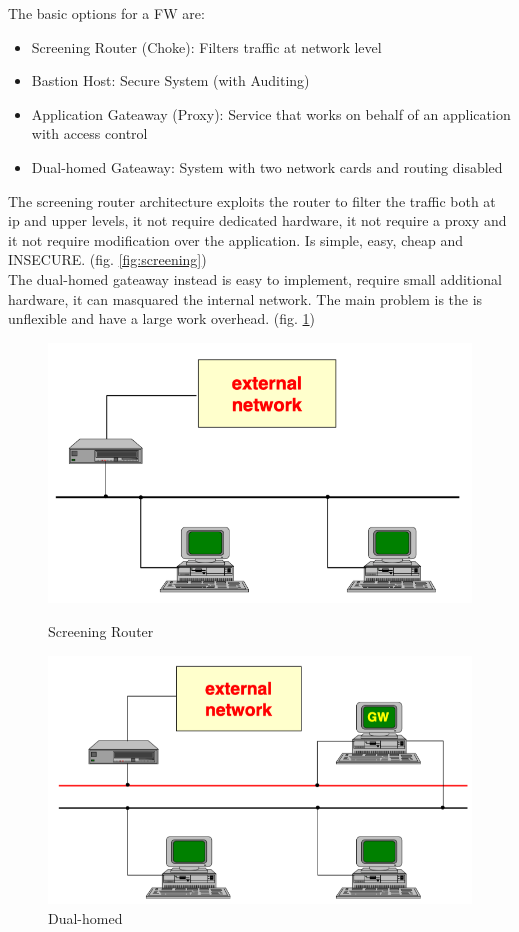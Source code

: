 \documentclass[12pt]{article}
\begin{document}
The basic options for a FW are:
\begin{itemize}
  \item Screening Router (Choke): Filters traffic at network level
  \item Bastion Host: Secure System (with Auditing)
  \item Application Gateaway (Proxy): Service that works on behalf of an application with access control
  \item Dual-homed Gateaway: System with two network cards and routing disabled
\end{itemize}
The screening router architecture exploits the router to filter the traffic both at ip and upper levels, it not require dedicated hardware, it not require a proxy and it not require modification over the application. Is simple, easy, cheap and INSECURE. (fig. \ref{fig:screening})\\
The dual-homed gateaway instead is easy to implement, require small additional hardware, it can masquared the internal network. The main problem is the is unflexible and have a large work overhead. (fig. \ref{fig:dual-homed})\\
\begin{figure}[h!]
  \centering
  \begin{minipage}{.48\textwidth}
    \centering
    \includegraphics[width=\linewidth]{images/screening.png}
    \caption{Screening Router}
    \label{fig:screening}
  \end{minipage}\hfill
  \begin{minipage}{.48\textwidth}
    \centering
    \includegraphics[width=\linewidth]{images/dual-homed.png}
    \caption{Dual-homed}
    \label{fig:dual-homed}
  \end{minipage}\hfill
\end{figure}
\end{document}
